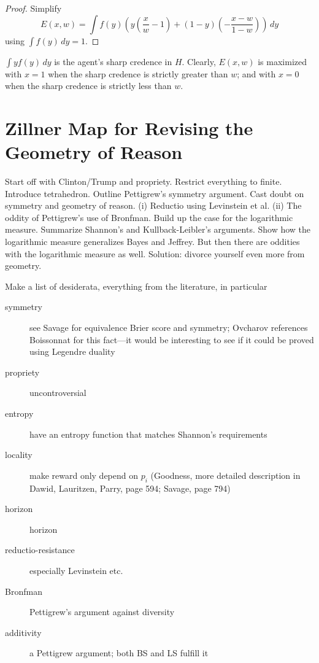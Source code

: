 \documentclass[12pt]{article}
\begin{document}
\begin{proof}
  \label{prf:dauchahs}
  Simplify
  \begin{equation}
    \label{eq:choobich}
    E(x,w)=\int{}f(y)\left(y\left(\frac{x}{w}-1\right)+(1-y)\left(-\frac{x-w}{1-w}\right)\right)\,dy
  \end{equation}
  using $\int{}f(y)\,dy=1$.
\end{proof}

$\int{}yf(y)\,dy$ is the agent's sharp credence in $H$. Clearly,
$E(x,w)$ is maximized with $x=1$ when the sharp credence is strictly
greater than $w$; and with $x=0$ when the sharp credence is strictly
less than $w$.

\section{Zillner Map for Revising the Geometry of Reason}
\label{section:xudahdoe}

Start off with Clinton/Trump and propriety. Restrict everything to
finite. Introduce tetrahedron. Outline Pettigrew's symmetry argument.
Cast doubt on symmetry and geometry of reason. (i) Reductio using
Levinstein et al. (ii) The oddity of Pettigrew's use of Bronfman.
Build up the case for the logarithmic measure. Summarize Shannon's and
Kullback-Leibler's arguments. Show how the logarithmic measure
generalizes Bayes and Jeffrey. But then there are oddities with the
logarithmic measure as well. Solution: divorce yourself even more from
geometry.

Make a list of desiderata, everything from the literature, in
particular
\begin{description}
\item[symmetry] see Savage for equivalence Brier score and symmetry;
  Ovcharov references Boissonnat for this fact---it would be
  interesting to see if it could be proved using Legendre duality
\item[propriety] uncontroversial
\item[entropy] have an entropy function that matches Shannon's requirements
\item[locality] make reward only depend on $p_{i}$ (Goodness, more detailed
  description in Dawid, Lauritzen, Parry, page 594; Savage, page 794)
\item[horizon] horizon
\item[reductio-resistance] especially Levinstein etc.
\item[Bronfman] Pettigrew's argument against diversity
\item[additivity] a Pettigrew argument; both BS and LS fulfill it
\end{description}
\end{document}
